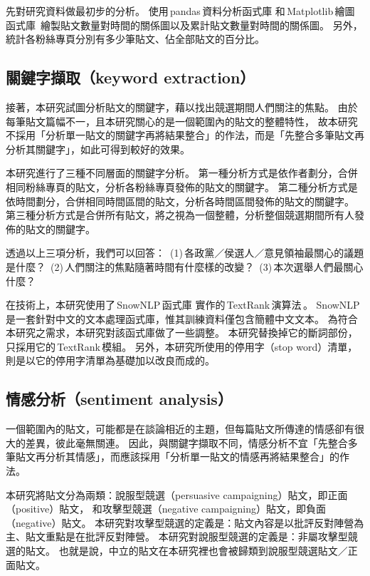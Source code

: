 \documentclass[letterpaper, 10pt, conference]{ieeeconf}   %
\begin{document}
\begin{CJK}{UTF8}{bsmi}
先對研究資料做最初步的分析。
使用\,pandas\,資料分析函式庫\,\cite{c9}\,和\,Matplotlib\,繪圖函式庫\,\cite{c10}
繪製貼文數量對時間的關係圖以及累計貼文數量對時間的關係圖。
另外，統計各粉絲專頁分別有多少筆貼文、佔全部貼文的百分比。

\subsection*{關鍵字擷取（keyword extraction）}

接著，本研究試圖分析貼文的關鍵字，藉以找出競選期間人們關注的焦點。
由於每筆貼文篇幅不一，且本研究關心的是一個範圍內的貼文的整體特性，
故本研究不採用「分析單一貼文的關鍵字再將結果整合」的作法，而是「先整合多筆貼文再分析其關鍵字」，如此可得到較好的效果。

本研究進行了三種不同層面的關鍵字分析。
第一種分析方式是依作者劃分，合併相同粉絲專頁的貼文，分析各粉絲專頁發佈的貼文的關鍵字。
第二種分析方式是依時間劃分，合併相同時間區間的貼文，分析各時間區間發佈的貼文的關鍵字。
第三種分析方式是合併所有貼文，將之視為一個整體，分析整個競選期間所有人發佈的貼文的關鍵字。

透過以上三項分析，我們可以回答：
\,(1)\,各政黨／侯選人／意見領袖最關心的議題是什麼？
\,(2)\,人們關注的焦點隨著時間有什麼樣的改變？
\,(3)\,本次選舉人們最關心什麼？

在技術上，本研究使用了\,SnowNLP\,函式庫\,\cite{c11}\,實作的\,TextRank\,演算法\,\cite{c12}。
SnowNLP\,是一套針對中文的文本處理函式庫，惟其訓練資料僅包含簡體中文文本。
為符合本研究之需求，本研究對該函式庫做了一些調整。
本研究替換掉它的斷詞部份，只採用它的\,TextRank\,模組。
另外，本研究所使用的停用字（stop word）清單，則是以它的停用字清單為基礎加以改良而成的。

\subsection*{情感分析（sentiment analysis）}

一個範圍內的貼文，可能都是在談論相近的主題，但每篇貼文所傳達的情感卻有很大的差異，彼此毫無關連。
因此，與關鍵字擷取不同，情感分析不宜「先整合多筆貼文再分析其情感」，而應該採用「分析單一貼文的情感再將結果整合」的作法。

本研究將貼文分為兩類：說服型競選（persuasive campaigning）貼文，即正面（positive）貼文，
和攻擊型競選（negative campaigning）貼文，即負面（negative）貼文。
本研究對攻擊型競選的定義是：貼文內容是以批評反對陣營為主、貼文重點是在批評反對陣營。
本研究對說服型競選的定義是：非屬攻擊型競選的貼文。
也就是說，中立的貼文在本研究裡也會被歸類到說服型競選貼文／正面貼文。


\end{CJK}
\end{document}
